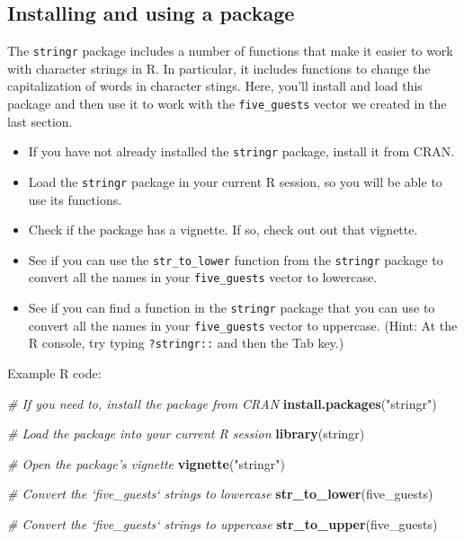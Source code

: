 \documentclass[]{book}
\makeatletter
\newenvironment{Shaded}{\begin{snugshade}}{\end{snugshade}}
\newcommand{\KeywordTok}[1]{\textcolor[rgb]{0.13,0.29,0.53}{\textbf{#1}}}
\newcommand{\StringTok}[1]{\textcolor[rgb]{0.31,0.60,0.02}{#1}}
\newcommand{\CommentTok}[1]{\textcolor[rgb]{0.56,0.35,0.01}{\textit{#1}}}
\newcommand{\NormalTok}[1]{#1}
\providecommand{\tightlist}{%
  \setlength{\itemsep}{0pt}\setlength{\parskip}{0pt}}
\newenvironment{kframe}{%
\medskip{}
\setlength{\fboxsep}{.8em}
 \def\at@end@of@kframe{}%
 \ifinner\ifhmode%
  \def\at@end@of@kframe{\end{minipage}}%
  \begin{minipage}{\columnwidth}%
 \fi\fi%
 \def\FrameCommand##1{\hskip\@totalleftmargin \hskip-\fboxsep
 \colorbox{shadecolor}{##1}\hskip-\fboxsep
     \hskip-\linewidth \hskip-\@totalleftmargin \hskip\columnwidth}%
 \MakeFramed {\advance\hsize-\width
   \@totalleftmargin\z@ \linewidth\hsize
   \@setminipage}}%
 {\par\unskip\endMakeFramed%
 \at@end@of@kframe}
\renewenvironment{Shaded}{\begin{kframe}}{\end{kframe}}
\theoremstyle{definition}
\theoremstyle{definition}
\theoremstyle{definition}
\theoremstyle{remark}
\makeatother
\begin{document}
\subsection{Installing and using a
package}\label{installing-and-using-a-package}

The \texttt{stringr} package includes a number of functions that make it
easier to work with character strings in R. In particular, it includes
functions to change the capitalization of words in character stings.
Here, you'll install and load this package and then use it to work with
the \texttt{five\_guests} vector we created in the last section.

\begin{itemize}
\tightlist
\item
  If you have not already installed the \texttt{stringr} package,
  install it from CRAN.
\item
  Load the \texttt{stringr} package in your current R session, so you
  will be able to use its functions.
\item
  Check if the package has a vignette. If so, check out out that
  vignette.
\item
  See if you can use the \texttt{str\_to\_lower} function from the
  \texttt{stringr} package to convert all the names in your
  \texttt{five\_guests} vector to lowercase.
\item
  See if you can find a function in the \texttt{stringr} package that
  you can use to convert all the names in your \texttt{five\_guests}
  vector to uppercase. (Hint: At the R console, try typing
  \texttt{?stringr::} and then the Tab key.)
\end{itemize}

Example R code:

\begin{Shaded}
\begin{Highlighting}[]
\CommentTok{# If you need to, install the package from CRAN}
\KeywordTok{install.packages}\NormalTok{(}\StringTok{"stringr"}\NormalTok{)}

\CommentTok{# Load the package into your current R session}
\KeywordTok{library}\NormalTok{(stringr)}

\CommentTok{# Open the package's vignette}
\KeywordTok{vignette}\NormalTok{(}\StringTok{"stringr"}\NormalTok{)}

\CommentTok{# Convert the `five_guests` strings to lowercase}
\KeywordTok{str_to_lower}\NormalTok{(five_guests)}

\CommentTok{# Convert the `five_guests` strings to uppercase}
\KeywordTok{str_to_upper}\NormalTok{(five_guests)}
\end{Highlighting}
\end{Shaded}
\end{document}
